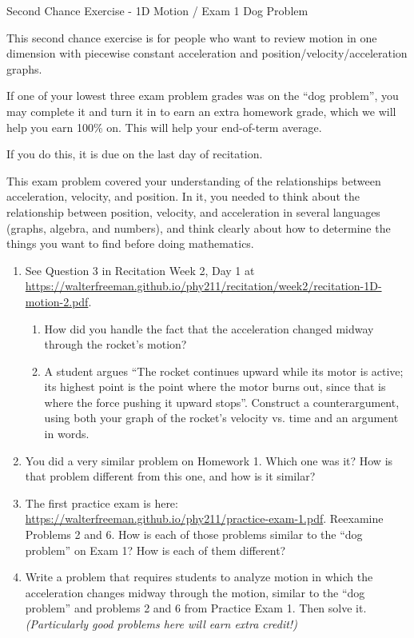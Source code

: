 \documentclass[12pt]{article}
\begin{document}
\begin{center}
\Large
\sc Second Chance Exercise - 1D Motion / Exam 1 Dog Problem \rm





\normalsize
This second chance exercise is for people who want to review motion in one dimension with piecewise constant acceleration and position/velocity/acceleration graphs. 

If one of your lowest three exam problem grades was on the ``dog problem'', you may complete it and turn it in to earn an extra homework grade, which we will help you earn 100\% on. This will help your end-of-term average.

If you do this, it is due on the last day of recitation.

\end{center}

\vspace{1.5in}

This exam problem covered your understanding of the relationships between acceleration, velocity, and position. In it, you needed to think about the relationship between position, velocity, and acceleration in several languages (graphs, algebra, and numbers), and think clearly about how to determine the things you want to find before doing mathematics.

\begin{enumerate}
		\item See Question 3 in Recitation Week 2, Day 1 at \url{https://walterfreeman.github.io/phy211/recitation/week2/recitation-1D-motion-2.pdf}. 
		\begin{enumerate}
			\item How did you handle the fact that the acceleration changed midway through the rocket's motion?
			\item A student argues ``The rocket continues upward while its motor is active; its highest point is the point where the motor burns out, since that is where the force pushing it upward stops''. Construct a counterargument, using both your graph of the rocket's velocity vs. time and an argument in words.
		\end{enumerate}
	\item You did a very similar problem on Homework 1. Which one was it? How is that problem different from this one, and how is it similar?

	\item The first practice exam is here: \url{https://walterfreeman.github.io/phy211/practice-exam-1.pdf}. Reexamine Problems 2 and 6. How is each of those problems similar to the ``dog problem'' on Exam 1? How is each of them different?

    \item Write a problem that requires students to analyze motion in which the acceleration changes midway through the motion, similar to the ``dog problem'' and problems 2 and 6 from Practice Exam 1. Then solve it. {\it (Particularly good problems here will earn extra credit!)}
\end{enumerate}
\end{document}
